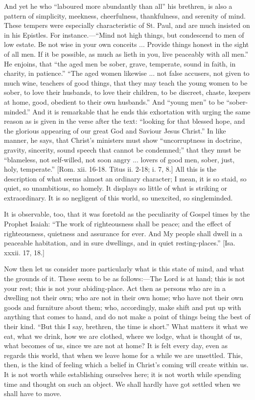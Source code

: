 And yet he who ``laboured more abundantly than all'' his
brethren, is also a pattern of simplicity, meekness, cheerfulness,
thankfulness, and serenity of mind. These tempers were especially
characteristic of St. Paul, and are much insisted on in his Epistles.
For instance.—``Mind not high things, but condescend to men of
low estate. Be not wise in your own conceits ... Provide things honest
in the sight of all men. If it be possible, as much as lieth in you,
live peaceably with all men.'' He enjoins, that ``the aged men
be sober, grave, temperate, sound in faith, in charity, in
patience.'' ``The aged women likewise ... not false accusers,
not given to much wine, teachers of good things, that they may teach
the young women to be sober, to love their husbands, to love their
children, to be discreet, chaste, keepers at home, good, obedient to
their own husbands.'' And ``young men'' to be
``sober-minded.'' And it is remarkable that he ends this
exhortation with urging the same reason as is given in the verse after
the text: ``looking for that blessed hope, and the glorious
appearing of our great God and Saviour Jesus Christ.'' In like
manner, he says, that Christ's ministers must show ``uncorruptness
in doctrine, gravity, sincerity, sound speech that cannot be
condemned;'' that they must be ``blameless, not self-willed,
not soon angry ... lovers of good men, sober, just, holy,
temperate.'' [Rom. xii. 16-18. Titus ii. 2-18; i. 7, 8.] All this
is the description of what seems almost an ordinary character; I mean,
it is so staid, so quiet, so unambitious, so homely. It displays so
little of what is striking or extraordinary. It is so negligent of
this world, so unexcited, so singleminded.

It is observable, too, that it was foretold as the peculiarity of
Gospel times by the Prophet Isaiah: ``The work of righteousness
shall be peace; and the effect of righteousness, quietness and
assurance for ever. And My people shall dwell in a peaceable
habitation, and in sure dwellings, and in quiet resting-places.''
[Isa. xxxii. 17, 18.]

Now then let us consider more particularly what is this state of
mind, and what the grounds of it. These seem to be as follows:—The
Lord is at hand; this is not your rest; this is not your
abiding-place. Act then as persons who are in a dwelling not their
own; who are not in their own home; who have not their own goods and
furniture about them; who, accordingly, make shift and put up with
anything that comes to hand, and do not make a point of things being
the best of their kind. ``But this I say, brethren, the time is
short.'' What matters it what we eat, what we drink, how we are
clothed, where we lodge, what is thought of us, what becomes of us,
since we are not at home? It is felt every day, even as regards this
world, that when we leave home for a while we are unsettled. This,
then, is the kind of feeling which a belief in Christ's coming will
create within us. It is not worth while establishing ourselves here;
it is not worth while spending time and thought on such an object. We
shall hardly have got settled when we shall have to move.

